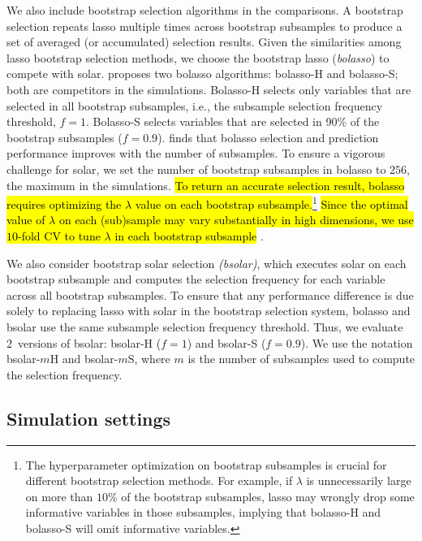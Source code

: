 \documentclass[11pt,review,authoryear]{elsarticle}
\begin{document}
We also include bootstrap selection algorithms in the comparisons. A bootstrap selection repeats lasso multiple times across bootstrap subsamples to produce a set of averaged (or accumulated) selection results. Given the similarities among lasso bootstrap selection methods, we choose the \citet{bach2008bolasso} bootstrap lasso (\emph{bolasso}) to compete with solar. \citet{bach2008bolasso} proposes two bolasso algorithms: bolasso-H and bolasso-S; both are competitors in the simulations. Bolasso-H selects only variables that are selected in all bootstrap subsamples, i.e., the subsample selection frequency threshold, $f=1$. Bolasso-S selects variables that are selected in 90\% of the bootstrap subsamples ($f=0.9$). \citet{bach2008bolasso} finds that bolasso selection and prediction performance improves with the number of subsamples. To ensure a vigorous challenge for solar, we set the number of bootstrap subsamples in bolasso to $256$, the maximum in the \citet{bach2008bolasso} simulations. \hl{To return an accurate selection result, bolasso requires optimizing the $\lambda$ value on each bootstrap subsample.}\footnote{The hyperparameter optimization on bootstrap subsamples is crucial for different bootstrap selection methods. For example, if $\lambda$ is unnecessarily large on more than $10\%$ of the bootstrap subsamples, lasso may wrongly drop some informative variables in those subsamples, implying that bolasso-H and bolasso-S will omit informative variables.} \hl{Since the optimal value of $\lambda$ on each (sub)sample may vary substantially in high dimensions, we use $10$-fold CV to tune $\lambda$ in each bootstrap subsample} \citep{friedman2001elements}.

We also consider bootstrap solar selection \emph{(bsolar)}, which executes solar on each bootstrap subsample and computes the selection frequency for each variable across all bootstrap subsamples. To ensure that any performance difference is due solely to replacing lasso with solar in the bootstrap selection system, bolasso and bsolar use the same subsample selection frequency threshold. Thus, we evaluate 2~versions of bsolar: bsolar-H ($f=1$) and bsolar-S ($f=0.9$). We use the notation bsolar-$m$H and bsolar-$m$S, where $m$ is the number of subsamples used to compute the selection frequency.

\subsection{Simulation settings}
\end{document}
